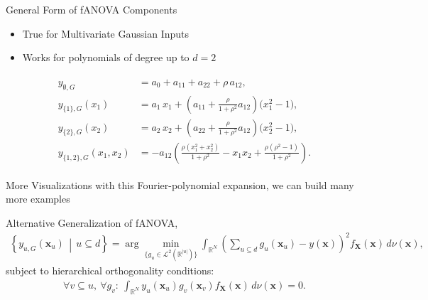 \begin{frame}{General Form of fANOVA Components}
  \begin{itemize}
    \item True for Multivariate Gaussian Inputs
    \item Works for polynomials of degree up to $d = 2$
  \end{itemize}
  \begin{align}
\begin{split}
y_{\emptyset, G} &= a_0 + a_{11} + a_{22} + \rho\,a_{12}, \\[0.5em]
y_{\{1\}, G}(x_1) &= a_1\,x_1 
  + \left(a_{11} + \frac{\rho}{1+\rho^2}a_{12}\right)\bigl(x_1^2 - 1\bigr), \\[0.5em]
y_{\{2\}, G}(x_2) &= a_2\,x_2 
  + \left(a_{22} + \frac{\rho}{1+\rho^2}a_{12}\right)\bigl(x_2^2 - 1\bigr), \\[0.5em]
y_{\{1,2\}, G}(x_1,x_2) 
&= -a_{12}\!\left(
    \frac{\rho(x_1^2+x_2^2)}{1+\rho^2} 
    - x_1 x_2 
    + \frac{\rho(\rho^2-1)}{1+\rho^2}
   \right).
\end{split}
\label{eq:fanova_components_2D_polynomial}
\end{align}
\end{frame}
  

\begin{frame}{More Visualizations}
  with this Fourier-polynomial expansion, we can build many more examples
  
\end{frame}



\begin{frame}{Alternative Generalization of fANOVA, \cite{hooker2007}}
    \begin{align*}
\left\{ y_{u, G}(\boldsymbol{x}_u) \,\middle|\, u \subseteq d \right\}
= \arg\min_{\{g_u \in \mathcal{L}^2(\mathbb{R}^{|u|})\}} 
\int_{\mathbb{R}^N} \left( \sum_{u \subseteq d} g_u(\boldsymbol{x}_u) - y(\boldsymbol{x}) \right)^2 
f_{\boldsymbol{X}}(\boldsymbol{x}) \, d \nu (\boldsymbol{x}),
\label{eq:generalized_fanova_components_hooker}
\end{align*}
subject to hierarchical orthogonality conditions:
\begin{align*}
    \forall v \subseteq u,\ \forall g_v:\ 
    \int_{\mathbb{R}^N} y_u(\boldsymbol{x}_u) g_v(\boldsymbol{x}_v) 
    f_{\boldsymbol{X}}(\boldsymbol{x}) \, d \nu (\boldsymbol{x}) = 0.
\end{align*}
\end{frame}

